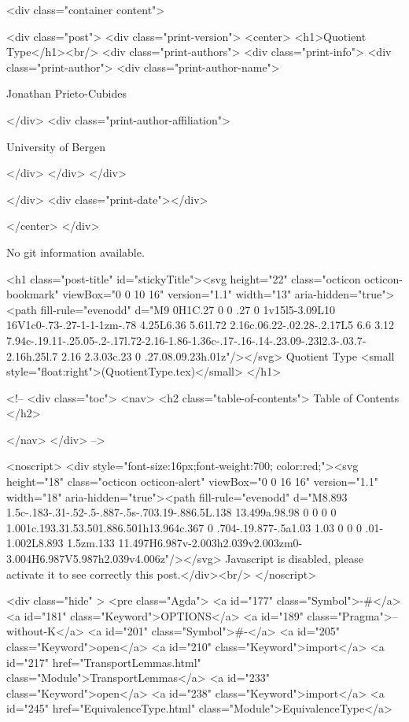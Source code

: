       <div class="container content">
        







<div class="post">
  <div class="print-version">
    <center>
      <h1>Quotient Type</h1><br/>
        <div class="print-authors">
          <div class="print-info">
            <div class="print-author">
              <div class="print-author-name">
                
                  Jonathan Prieto-Cubides
                
              </div>
              <div class="print-author-affiliation">
                
                  University of Bergen
                
                </div>
            </div>
          </div>
          
          
        </div>
        <div class="print-date"></div>
        
        
    </center>
  </div>

  
  No git information available.
  

  <h1 class="post-title" id="stickyTitle"><svg height="22" class="octicon octicon-bookmark" viewBox="0 0 10 16" version="1.1" width="13" aria-hidden="true"><path fill-rule="evenodd" d="M9 0H1C.27 0 0 .27 0 1v15l5-3.09L10 16V1c0-.73-.27-1-1-1zm-.78 4.25L6.36 5.61l.72 2.16c.06.22-.02.28-.2.17L5 6.6 3.12 7.94c-.19.11-.25.05-.2-.17l.72-2.16-1.86-1.36c-.17-.16-.14-.23.09-.23l2.3-.03.7-2.16h.25l.7 2.16 2.3.03c.23 0 .27.08.09.23h.01z"/></svg> Quotient Type <small style="float:right">(QuotientType.tex)</small>
  </h1>

  <!-- 
  <div class="toc">
    <nav>
    <h2 class="table-of-contents"> Table of Contents </h2>
      

    </nav>
  </div>
   -->

  <noscript>
  <div style="font-size:16px;font-weight:700; color:red;"><svg height="18" class="octicon octicon-alert" viewBox="0 0 16 16" version="1.1" width="18" aria-hidden="true"><path fill-rule="evenodd" d="M8.893 1.5c-.183-.31-.52-.5-.887-.5s-.703.19-.886.5L.138 13.499a.98.98 0 0 0 0 1.001c.193.31.53.501.886.501h13.964c.367 0 .704-.19.877-.5a1.03 1.03 0 0 0 .01-1.002L8.893 1.5zm.133 11.497H6.987v-2.003h2.039v2.003zm0-3.004H6.987V5.987h2.039v4.006z"/></svg> Javascript is disabled, please activate it to see correctly this post.</div><br/>
  </noscript>

  <div class="hide" >
<pre class="Agda">
<a id="177" class="Symbol">{-#</a> <a id="181" class="Keyword">OPTIONS</a> <a id="189" class="Pragma">--without-K</a> <a id="201" class="Symbol">#-}</a>
<a id="205" class="Keyword">open</a> <a id="210" class="Keyword">import</a> <a id="217" href="TransportLemmas.html" class="Module">TransportLemmas</a>
<a id="233" class="Keyword">open</a> <a id="238" class="Keyword">import</a> <a id="245" href="EquivalenceType.html" class="Module">EquivalenceType</a>

